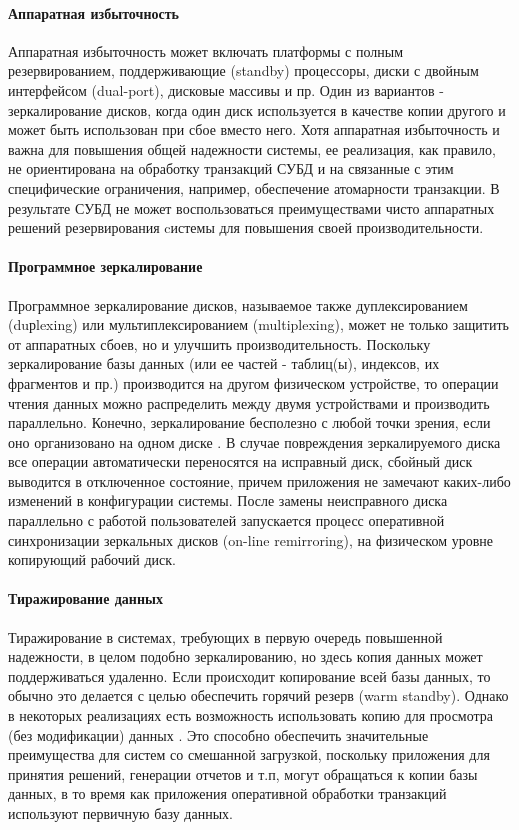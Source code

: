 \paragraph{Аппаратная избыточность}
Аппаратная избыточность может включать платформы с полным резервированием, поддерживающие (standby) процессоры, диски с двойным интерфейсом (dual-port), дисковые массивы и пр. Один из вариантов - зеркалирование дисков, когда один диск используется в качестве копии другого и может быть использован при сбое вместо него. Хотя аппаратная избыточность и важна для повышения общей надежности системы, ее реализация, как правило, не ориентирована на обработку транзакций СУБД и на связанные с этим специфические ограничения, например, обеспечение атомарности транзакции. В результате СУБД не может воспользоваться преимуществами чисто аппаратных решений резервирования cистемы для повышения своей производительности.
\paragraph{Программное зеркалирование} 

Программное зеркалирование дисков, называемое также дуплексированием (duрlexing) или мультиплексированием (multiplexing), может не только защитить от аппаратных сбоев, но и улучшить производительность. Поскольку зеркалирование базы данных (или ее частей - таблиц(ы), индексов, их фрагментов и пр.) производится на другом физическом устройстве, то операции чтения данных можно распределить между двумя устройствами и производить параллельно. Конечно, зеркалирование бесполезно с любой точки зрения, если оно организовано на одном диске \autocite{Baron}.
В случае повреждения зеркалируемого диска все операции автоматически переносятся на исправный диск, сбойный диск выводится в отключенное состояние, причем приложения не замечают каких-либо изменений в конфигурации системы.
После замены неисправного диска параллельно с работой пользователей запускается процесс оперативной синхронизации зеркальных дисков (on-line remirroring), на физическом уровне копирующий рабочий диск. \\
\paragraph{Тиражирование данных}
Тиражирование в системах, требующих в первую очередь повышенной надежности, в
целом подобно зеркалированию, но здесь копия данных может поддерживаться
удаленно. Если происходит копирование всей базы данных, то обычно это делается с
целью обеспечить горячий резерв (warm standby). Однако в некоторых реализациях
есть возможность использовать копию для просмотра (без модификации) данных \autocite{Baron}. Это способно обеспечить значительные преимущества для систем со смешанной загрузкой, поскольку приложения для принятия решений, генерации отчетов и т.п,
могут обращаться к копии базы данных, в то время как приложения оперативной обработки транзакций используют первичную базу данных.
